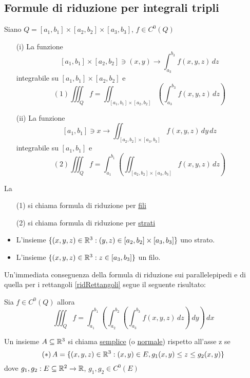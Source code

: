 \subsection{Formule di riduzione per integrali tripli}
\begin{theorem}
  Siano $Q = [a_1,b_1]\times [a_2,b_2]\times [a_3,b_3]$, $f \in C^0(Q)$
  \begin{enumerate}
    \item[(i)] La funzione $$[a_1,b_1]\times [a_2,b_2] \ni (x,y) \to \int_{a_3}^{b_3} f(x,y,z) \,dz$$
              \ace integrabile su $[a_1,b_1]\times [a_2,b_2]$ e 
              $$(1) \iiint_{Q} f = \iint_{[a_1,b_1]\times [a_2,b_2]} \left(\int_{a_3}^{b_3} f(x,y,z) \,dz\right)$$
    \item[(ii)] La funzione $$[a_1,b_1] \ni x \to \iint_{[a_2,b_2]\times [a_3,b_3]} f(x,y,z) \,dy\,dz$$
                \ace integrabile su $[a_1,b_1]$ e 
                $$(2) \iiint_{Q} f = \int_{a_1}^{b_1} \left(\iint_{[a_2,b_2]\times[a_3,b_3]} f(x,y,z) \,dz\right)$$
  \end{enumerate}
  La \begin{itemize}
    \item[(1)] si chiama formula di riduzione per \underline{fili}
    \item[(2)] si chiama formula di riduzione per \underline{strati}
  \end{itemize}
  \begin{itemize}
    \item L'insieme $\{(x,y,z)\in\mathbb{R}^3:(y,z)\in[a_2,b_2]\times[a_3,b_3]\}$ \ace uno strato.
    \item L'insieme $\{(x,y,z)\in\mathbb{R}^3: z\in[a_3,b_3]\}$ \ace un filo.
  \end{itemize}
\end{theorem}
Un'immediata conseguenza della formula di riduzione sui parallelepipedi e di quella per i rettangoli \ref{ridRettangoli}
segue il seguente risultato:
\begin{corollary}
  Sia $f \in C^0(Q)$ allora 
  $$\iiint_{Q} f = \int_{a_1}^{b_1} \left( \int_{a_2}^{b_2} \left(\int_{a_3}^{b_3} f(x,y,z) \,dz\right)\,dy\right)\,dx$$
\end{corollary}
\begin{definition}
  Un insieme $A \subseteq \mathbb{R}^3$ si chiama \underline{semplice} (o \underline{normale}) rispetto all'asse z se 
  $$(*) \, A=\{(x,y,z)\in\mathbb{R}^3: (x,y)\in E, g_1(x,y)\leq z \leq g_2(x,y)\}$$
  dove $g_1,g_2 : E \subseteq \mathbb{R}^2 \to \mathbb{R}$, $g_1,g_2 \in C^0(E)$
\end{definition}
